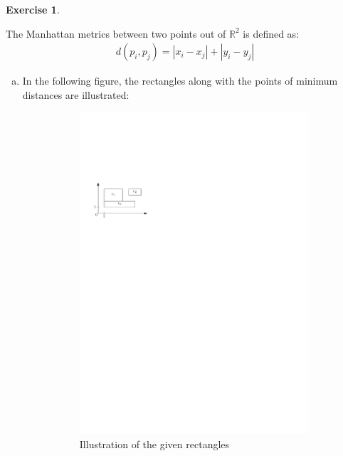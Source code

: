 \documentclass[a4paper,12pt,headsepline]{scrartcl}
\newtheorem{aufgabe}{Exercise}
\begin{document}
\newpage
\begin{aufgabe}
\end{aufgabe}
The Manhattan metrics between two points out of $\mathbb{R}^2$ is defined as:
\begin{align*}
d(p_i,p_j) = |x_i - x_j| + |y_i - y_j|
\end{align*}
\begin{enumerate}[a)]
	\item In the following figure, the rectangles along with the points of minimum distances are illustrated:
	\begin{figure}[H]
		\centering
		\begin{subfigure}{0.48\textwidth}
			\centering
			\includegraphics[width=1\linewidth,page=1]{graphics/7_2.pdf}
			\caption*{Illustration of the given rectangles}
		\end{subfigure}
		\begin{subfigure}{0.48\textwidth}

\end{subfigure}
\end{figure}
\end{enumerate}
\end{document}
